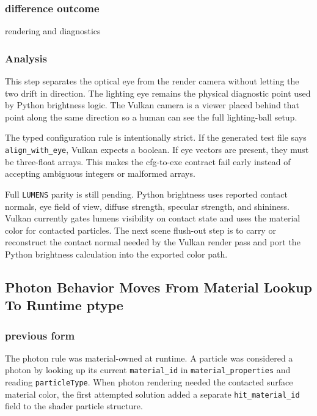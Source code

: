\subsubsection{difference outcome}

rendering and diagnostics

\subsubsection{Analysis}

This step separates the optical eye from the render camera without letting the
two drift in direction.  The lighting eye remains the physical diagnostic
point used by Python brightness logic.  The Vulkan camera is a viewer placed
behind that point along the same direction so a human can see the full
lighting-ball setup.

The typed configuration rule is intentionally strict.  If the generated test
file says \texttt{align\_with\_eye}, Vulkan expects a boolean.  If eye vectors
are present, they must be three-float arrays.  This makes the cfg-to-exe
contract fail early instead of accepting ambiguous integers or malformed
arrays.

Full \texttt{LUMENS} parity is still pending.  Python brightness uses reported
contact normals, eye field of view, diffuse strength, specular strength, and
shininess.  Vulkan currently gates lumens visibility on contact state and uses
the material color for contacted particles.  The next scene flush-out step is
to carry or reconstruct the contact normal needed by the Vulkan render pass
and port the Python brightness calculation into the exported color path.

\subsection{Photon Behavior Moves From Material Lookup To Runtime ptype}

\subsubsection{previous form}

The photon rule was material-owned at runtime.  A particle was considered a
photon by looking up its current \texttt{material\_id} in
\texttt{material\_properties} and reading \texttt{particleType}.  When photon
rendering needed the contacted surface material color, the first attempted
solution added a separate \texttt{hit\_material\_id} field to the shader
particle structure.

